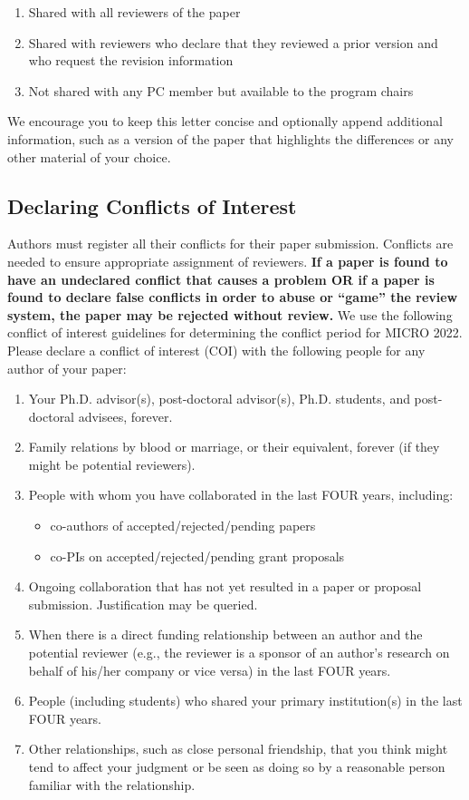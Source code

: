 \documentclass{sig-alternate}
\begin{document}
{\begin{enumerate}
\item Shared with all reviewers of the paper 
\item Shared with reviewers who declare that they reviewed a prior version and who request the revision information
\item Not shared with any PC member but available to the program chairs
\end{enumerate}

We encourage you to keep this letter concise and optionally append additional information, such as a version of the paper that highlights the differences or any other material of your choice.

\subsection{Declaring Conflicts of Interest}
Authors must register all their conflicts for their paper submission. Conflicts are needed to ensure appropriate assignment of reviewers. {\bf If a paper is found to have an undeclared conflict that causes a problem OR if a paper is found to declare false conflicts in order to abuse or ``game'' the review system, the paper may be rejected without review.} We use the following conflict of interest guidelines for determining the conflict period for MICRO 2022.  Please declare a conflict of interest (COI) with the following people for any author of your paper:

\begin{enumerate}
\item Your Ph.D. advisor(s), post-doctoral advisor(s), Ph.D. students,
      and post-doctoral advisees, forever.
\item Family relations by blood or marriage, or their equivalent,
      forever (if they might be potential reviewers).
\item People with whom you have collaborated in the last FOUR years, including:
  \begin{itemize}
  \item co-authors of accepted/rejected/pending papers
  \item co-PIs on accepted/rejected/pending grant proposals
  \end{itemize}
\item Ongoing collaboration that has not yet resulted in a paper or proposal submission. Justification may be queried.
\item When there is a direct funding relationship between an author and the potential reviewer (e.g., the reviewer is a sponsor of an author's research on behalf of his/her company or vice versa) in the last FOUR years.
\item People (including students) who shared your primary institution(s) in the last FOUR years.
\item Other relationships, such as close personal friendship, that you think might tend
to affect your judgment or be seen as doing so by a reasonable person familiar
with the relationship.
\end{enumerate}

}
\end{document}

